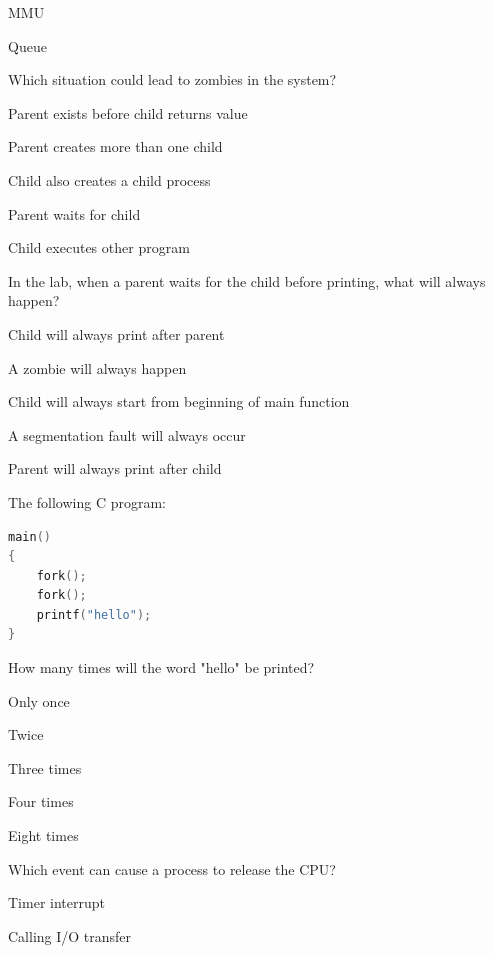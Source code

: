 \begin{questions}
\begin{verticalchoices}
\item MMU
\item Queue
\end{verticalchoices}
\question Which situation could lead to zombies in the system?
\begin{verticalchoices}
\item Parent exists before child returns value
\item Parent creates more than one child
\item Child also creates a child process
\item Parent waits for child
\item Child executes other program
\end{verticalchoices}
\end{questions}\vfill\newpage

\begin{questions}\setlength{\itemsep}{0.08cm}\setcounter{question}{12}
\question In the lab, when a parent waits for the child before printing, what will always happen?
\begin{verticalchoices}
\item Child will always print after parent
\item A zombie will always happen
\item Child will always start from beginning of main function
\item A segmentation fault will always occur
\item Parent will always print after child
\end{verticalchoices}
\question The following C program:
\begin{lstlisting}[language=C,basicstyle={\normalfont},columns=fullflexible,keepspaces=true,showstringspaces=false,aboveskip=0pt,belowskip=0pt]
main()
{
    fork();
    fork();
    printf("hello");
}
\end{lstlisting}
How many times will the word "hello" be printed?
\begin{verticalchoices}
\item Only once
\item Twice
\item Three times
\item Four times
\item Eight times
\end{verticalchoices}
\question Which event can cause a process to release the CPU?
\begin{verticalchoices}
\item Timer interrupt
\item Calling I/O transfer

\end{verticalchoices}
\end{questions}
